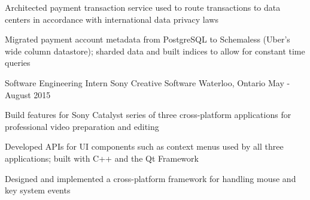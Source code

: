 \begin{cventries}
{\begin{cvitems}
      \item Architected payment transaction service used to route transactions to data centers in accordance with international data privacy laws
      \item Migrated payment account metadata from PostgreSQL to Schemaless (Uber's wide column datastore); sharded data and built indices to allow for constant time queries
      \end{cvitems}
    }
  \cventry
    {Software Engineering Intern}
    {Sony Creative Software}
    {Waterloo, Ontario}
    {May - August 2015}
    {
      \begin{cvitems}
        \item Build features for Sony Catalyst series of three cross-platform applications for professional video preparation and editing
        \item Developed APIs for UI components such as context menus used by all three applications; built with C++ and the Qt Framework
        \item Designed and implemented a cross-platform framework for handling mouse and key system events
      \end{cvitems}
    }
\end{cventries}

